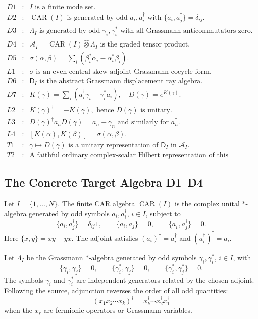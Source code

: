 \[
\begin{array}{rcl}
D1&:&I\text{ is a finite mode set.}\\
D2&:&\operatorname{CAR}(I)\text{ is generated by odd }a_i,a_i^\dagger
      \text{ with }\{a_i,a_j^\dagger\}=\delta_{ij}.\\
D3&:&\Lambda_I\text{ is generated by odd }\gamma_i,\gamma_i^*
      \text{ with all Grassmann anticommutators zero.}\\
D4&:&\mathcal A_I=\operatorname{CAR}(I)\widehat\otimes\Lambda_I
      \text{ is the graded tensor product.}\\
D5&:&\sigma(\alpha,\beta)=\sum_i(\beta_i^*\alpha_i-\alpha_i^*\beta_i).\\
L1&:&\sigma\text{ is an even central skew-adjoint Grassmann cocycle form.}\\
D6&:&\mathsf D_I\text{ is the abstract Grassmann displacement ray algebra.}\\
D7&:&K(\gamma)=\sum_i(a_i^\dagger\gamma_i-\gamma_i^*a_i),
      \quad D(\gamma)=e^{K(\gamma)}.\\
L2&:&K(\gamma)^\dagger=-K(\gamma),\text{ hence }D(\gamma)\text{ is unitary.}\\
L3&:&D(\gamma)^\dagger a_nD(\gamma)=a_n+\gamma_n\text{ and similarly for }
      a_n^\dagger.\\
L4&:&[K(\alpha),K(\beta)]=\sigma(\alpha,\beta).\\
T1&:&\gamma\mapsto D(\gamma)\text{ is a unitary representation of }\mathsf D_I
      \text{ in }\mathcal A_I.\\
T2&:&\text{A faithful ordinary complex-scalar Hilbert representation of this
      Grassmann cocycle is not the theorem.}
\end{array}
\]

\subsection{The Concrete Target Algebra D1--D4}

Let \(I=\{1,\ldots,N\}\).  The finite CAR algebra
\(\operatorname{CAR}(I)\) is the complex unital \(*\)-algebra generated by odd
symbols \(a_i,a_i^\dagger\), \(i\in I\), subject to
\[
  \{a_i,a_j^\dagger\}=\delta_{ij}1,\qquad
  \{a_i,a_j\}=0,\qquad
  \{a_i^\dagger,a_j^\dagger\}=0.
\]
Here \(\{x,y\}=xy+yx\).  The adjoint satisfies
\((a_i)^\dagger=a_i^\dagger\) and \((a_i^\dagger)^\dagger=a_i\).

Let \(\Lambda_I\) be the Grassmann \(*\)-algebra generated by odd symbols
\(\gamma_i,\gamma_i^*\), \(i\in I\), with
\[
  \{\gamma_i,\gamma_j\}=0,\qquad
  \{\gamma_i^*,\gamma_j\}=0,\qquad
  \{\gamma_i^*,\gamma_j^*\}=0.
\]
The symbols \(\gamma_i\) and \(\gamma_i^*\) are independent generators related
by the chosen adjoint.  Following the source, adjunction reverses the order of
all odd quantities:
\[
  (x_1x_2\cdots x_k)^\dagger
  =
  x_k^\dagger\cdots x_2^\dagger x_1^\dagger
\]
when the \(x_r\) are fermionic operators or Grassmann variables.

